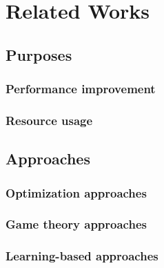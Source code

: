 \chapter{Related Works}\label{ch:related_works}

\section{Purposes}\label{sec:related_works:purposes}

\subsection{Performance improvement}

\subsection{Resource usage}

\section{Approaches}\label{sec:related_works:approaches}

\subsection{Optimization approaches}

\subsection{Game theory approaches}

\subsection{Learning-based approaches}
